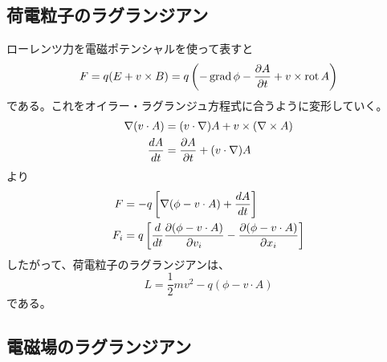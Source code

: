 \subsection{荷電粒子のラグランジアン}
    ローレンツ力を電磁ポテンシャルを使って表すと
        \[F = q(E + v \times B) = q\left(-\grad\phi - \pd[A]{t} + v \times \rot A\right)\]
    である。これをオイラー・ラグランジュ方程式に合うように変形していく。
    \begin{align*}
        \nabla(v \cdot A) &= (v \cdot \nabla)A + v \times (\nabla \times A)\\
        \de[A]{t} &= \pd[A]{t} + (v \cdot \nabla)A
    \end{align*}
    より
    \begin{align*}
        F &= -q \left[\nabla(\phi - v\cdot A) + \de[A]{t}\right]\\
        F_i &= q\left[\de{t}\pd[(\phi - v\cdot A)]{v_i} - \pd[(\phi - v\cdot A)]{x_i}\right]
    \end{align*}
    したがって、荷電粒子のラグランジアンは、
        \[L = \frac{1}{2}mv^2 - q(\phi - v\cdot A)\]
    である。

\subsection{電磁場のラグランジアン}